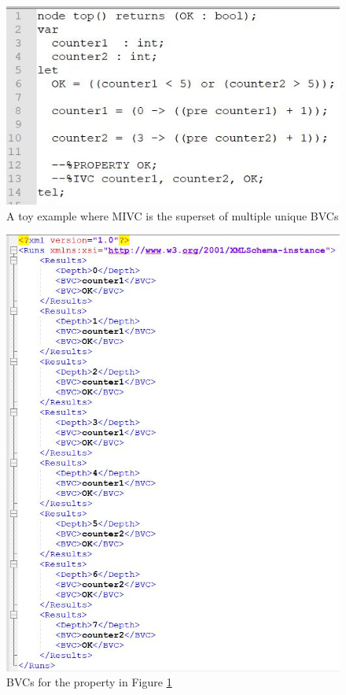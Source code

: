 \begin{figure}
 \centering
  \includegraphics[width=0.8\columnwidth]{figs/toybvc2.jpg}
  \caption{A toy example where MIVC is the superset of multiple unique BVCs}
  \vspace{0.1in}
  \label{fig:toybvc2}
\end{figure}

\begin{figure}
 \centering
  \includegraphics[width=\columnwidth]{figs/toyo2.jpg}
  \caption{BVCs for the property in Figure \ref{fig:toybvc2}}
  \vspace{0.1in}
  \label{fig:toyo2}
\end{figure}